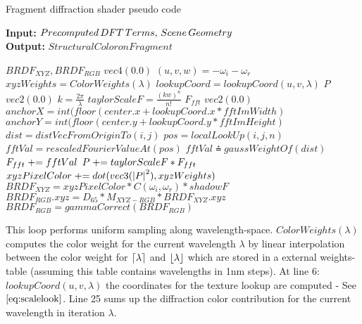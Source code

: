 \begin{algorithm}[H]
  \caption{Fragment diffraction shader pseudo code}
  \textbf{Input:} $Precomputed \thinspace DFT \thinspace Terms,\thinspace Scene \thinspace Geometry$ \\
  \textbf{Output:} $Structural Color on Fragment$ \\
  \setlength{\fboxrule}{0pt} 
  \begin{boxedminipage}{1.0\textwidth}
  \begin{algorithmic}[1]
      \State \init $BRDF_{XYZ}, BRDF_{RGB}$ \myto $vec4(0.0)$
      \State $(u,v,w) = -\omega_i - \omega_r$
        \State $xyzWeights = ColorWeights(\lambda)$
        \State $lookupCoord = lookupCoord(u, v, \lambda)$
        \State \init $P$ \myto $vec2(0.0)$
        \State $k = \frac{2\pi}{\lambda}$
          \State $taylorScaleF = \frac{(kw)^n}{n!}$
          \State \init $F_{fft}$  \myto $vec2(0.0)$
          \State $anchorX = int(floor(center.x + lookupCoord.x * fftImWidth)$
          \State $anchorY = int(floor(center.y + lookupCoord.y * fftImHeight)$
              \State $dist = distVecFromOriginTo(i,j)$
              \State $pos = localLookUp(i,j,n)$
              \State $fftVal = rescaledFourierValueAt(pos)$
              \State $fftVal \asteq gaussWeightOf(dist)$
              \State $F_{fft} \mathrel{+}= fftVal$
            \EndFor
          \EndFor
          \State $P \mathrel{+}= taylorScaleF*F_{fft}$
        \EndFor
        \State $xyzPixelColor \mathrel{+}= dot(vec3(\left|P\right|^2), xyzWeights)$
      \EndFor
      \State $BRDF_{XYZ} = xyzPixelColor*C(\omega_i, \omega_r)*shadowF$
      \State $BRDF_{RGB}.xyz = D_{65}*M_{XYZ-RGB}*BRDF_{XYZ}.xyz$
      \State $BRDF_{RGB}= gammaCorrect(BRDF_{RGB})$
    \EndFor
  \end{algorithmic}
  \end{boxedminipage}
  \vskip1.5pt
  \label{alg:fragmentshaderall}
\end{algorithm}


This loop performs uniform sampling along wavelength-space. $ColorWeights(\lambda)$ computes the color weight for the current wavelength $\lambda$ by linear interpolation between the color weight for $\lceil\lambda\rceil$ and $\lfloor\lambda\rfloor$ which are stored in a external weights-table (assuming this table contains wavelengths in 1nm steps). At line 6: $lookupCoord(u, v, \lambda)$ the coordinates for the texture lookup are computed - See $\ref{eq:scalelook}$. Line 25 sums up the diffraction color contribution for the current wavelength in iteration $\lambda$.  

